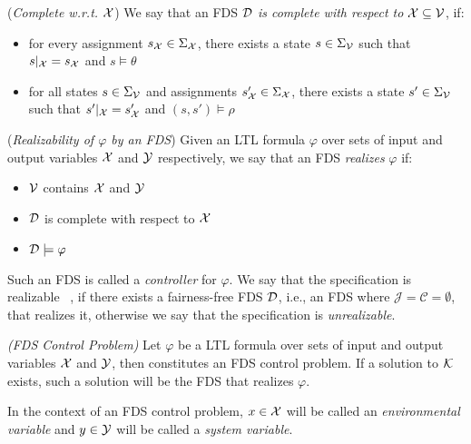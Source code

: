 \begin{definition}
	\label{def:complete_fds} (\emph{Complete w.r.t.} ${\mathcal{X}}$)
	We say that an FDS $\mathcal{D}$ \emph{is complete with respect to} ${\mathcal{X}} \subseteq {\mathcal{V}}$, if:
	\begin{itemize}
		\item for every assignment $s_{{\mathcal{X}}} \in \Sigma_{{\mathcal{X}}}$, there exists a state $s \in \Sigma_{{\mathcal{V}}}$ such that $s|_{{\mathcal{X}}} = s_{{\mathcal{X}}}$ and $s \models \theta$
		\item for all states $s \in \Sigma_{{\mathcal{V}}}$ and assignments $s'_{{\mathcal{X}}} \in \Sigma_{{\mathcal{X}}}$, there exists a state $s' \in \Sigma_{{\mathcal{V}}}$ such that $s'|_{{\mathcal{X}}}=s'_{{\mathcal{X}}}$ and $(s,s') \models \rho$
	\end{itemize}
\end{definition}

\begin{definition}
	\label{def:fds_realizability} (\emph{Realizability of $\varphi$ by an FDS})
	Given an LTL formula $\varphi$ over sets of input and output variables ${\mathcal{X}}$ and ${\mathcal{Y}}$ respectively, we say that an FDS \fdsDef \emph{realizes} $\varphi$ if:
	\begin{itemize}
		\item ${\mathcal{V}}$ contains ${\mathcal{X}}$ and ${\mathcal{Y}}$ 
		\item $\mathcal{D}$ is complete with respect to ${\mathcal{X}}$
		\item $\mathcal{D} \models \varphi$
	\end{itemize}
	Such an FDS is called a \emph{controller} for $\varphi$. We say that the specification is realizable ~\cite{pnueli1989synthesis}, if there exists a fairness-free FDS $\mathcal{D}$, i.e., an FDS where $\mathcal{J} =\mathcal{C} = \emptyset$, that realizes it, otherwise we say that the specification is \emph{unrealizable}.
\end{definition}

\begin{definition}
	\label{def:fds_control_problem} \emph{(FDS Control Problem)} 
	Let $\varphi$ be a LTL formula over sets of input and output variables ${\mathcal{X}}$ and ${\mathcal{Y}}$, then \fdsControlProblemDef constitutes an FDS control problem. If a solution to ${\mathcal{K}}$ exists, such a solution will be the FDS \fdsDef that realizes $\varphi$.
\end{definition}
In the context of an FDS control problem, $x \in {\mathcal{X}}$ will be called an \emph{environmental variable} and $y \in {\mathcal{Y}}$ will be called a \emph{system variable}.